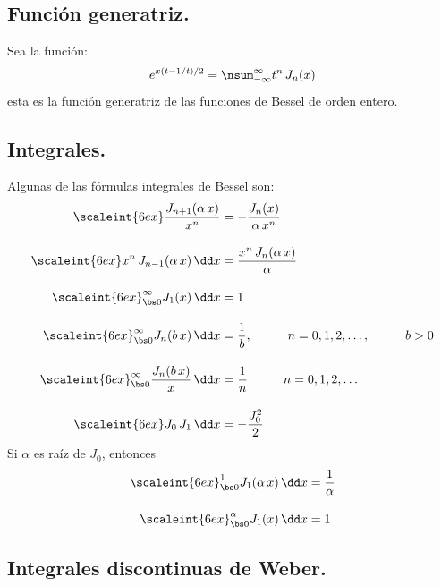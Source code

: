 \subsection{Función generatriz.}

Sea la función:
\begin{align*}
e^{x(t-1/t)/2} = \nsum_{-\infty}^{\infty} t^{n} \, J_{n} (x)
\end{align*}
esta es la función generatriz de las funciones de Bessel de orden entero.

\subsection{Integrales.}

Algunas de las fórmulas integrales de Bessel son:
\begin{align*}
\scaleint{6ex} \dfrac{J_{n+1} (\alpha \, x)}{x^{n}} &= - \dfrac{J_{n}(x)}{\alpha \, x^{n}} \\[1em]
\scaleint{6ex} x^{n} \, J_{n-1} (\alpha \, x) \, \dd x &= \dfrac{x^{n} \, J_{n}(\alpha \, x)}{\alpha} \\[1em]
\scaleint{6ex}_{\bs 0}^{\infty} J_{1}(x) \, \dd x &= 1 \\[1em]
\scaleint{6ex}_{\bs 0}^{\infty} J_{n} (b \, x) \, \dd x &= \dfrac{1}{b}, \hspace{1cm} n = 0, 1, 2, \ldots, \hspace{1cm} b > 0 \\[1em]
\scaleint{6ex}_{\bs 0}^{\infty} \dfrac{J_{n} (b \, x)}{x} \, \dd x &= \dfrac{1}{n} \hspace{1cm} n = 0, 1, 2, \ldots \\[1em]
\scaleint{6ex} J_{0} \, J_{1} \, \dd x &= - \dfrac{J_{0}^{2}}{2}
\end{align*}
Si $\alpha$ es raíz de $J_{0}$, entonces
\begin{align*}
\scaleint{6ex}_{\bs 0}^{1} J_{1} (\alpha \, x) \, \dd x &= \dfrac{1}{\alpha} \\[1em]
\scaleint{6ex}_{\bs 0}^{\alpha} J_{1} (x) \, \dd x &= 1
\end{align*}

\subsection{Integrales discontinuas de Weber.}

